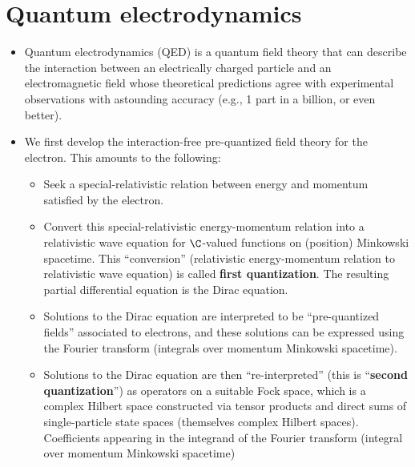 

\chapter{Quantum electrodynamics}
\setcounter{theorem}{0}
\setcounter{equation}{0}


\renewcommand{\theenumi}{\roman{enumi}}
\renewcommand{\labelenumi}{\textnormal{(\theenumi)}$\;\;$}


\begin{itemize}
\item
	Quantum electrodynamics (QED) is a quantum field theory that can describe
	the interaction between an electrically charged particle and an electromagnetic field
	whose theoretical predictions agree with experimental observations with astounding accuracy
	(e.g., 1 part in a billion, or even better).
\item
	We first develop the interaction-free pre-quantized field theory for the electron.
	This amounts to the following:
	\begin{itemize}
	\item
		Seek a special-relativistic relation between energy and momentum satisfied by the electron.
	\item
		Convert this special-relativistic energy-momentum relation into a relativistic wave equation
		for $\C$-valued functions on (position) Minkowski spacetime.
		This ``conversion'' (relativistic energy-momentum relation to relativistic wave equation)
		is called \textbf{first quantization}.
		The resulting partial differential equation is the Dirac equation.
	\item
		Solutions to the Dirac equation are interpreted to be ``pre-quantized fields'' associated to electrons, and
		these solutions can be expressed using the Fourier transform (integrals over momentum Minkowski spacetime).
	\item
		Solutions to the Dirac equation are then ``re-interpreted'' (this is ``\textbf{second quantization}'')
		as operators on a suitable Fock space,
		which is a complex Hilbert space constructed via tensor products and direct sums of single-particle state spaces
		(themselves complex Hilbert spaces).
		Coefficients appearing in the integrand of the Fourier transform (integral over momentum Minkowski spacetime)

\end{itemize}
\end{itemize}
